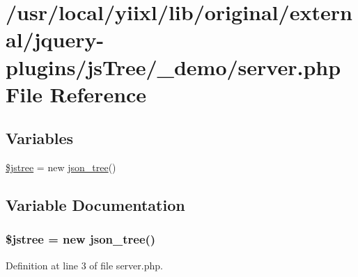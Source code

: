\hypertarget{server_8php}{
\section{/usr/local/yiixl/lib/original/external/jquery-\/plugins/jsTree/\_\-demo/server.php File Reference}
\label{server_8php}
}
\subsection*{Variables}
\begin{DoxyCompactItemize}
\item 
\hyperlink{server_8php_a003c4013d4a58b798d75deaf64f96a15}{\$jstree} = new \hyperlink{classjson__tree}{json\_\-tree}()
\end{DoxyCompactItemize}


\subsection{Variable Documentation}
\hypertarget{server_8php_a003c4013d4a58b798d75deaf64f96a15}{
\subsubsection[{\$jstree}]{\setlength{\rightskip}{0pt plus 5cm}\$jstree = new {\bf json\_\-tree}()}}
\label{server_8php_a003c4013d4a58b798d75deaf64f96a15}


Definition at line 3 of file server.php.

